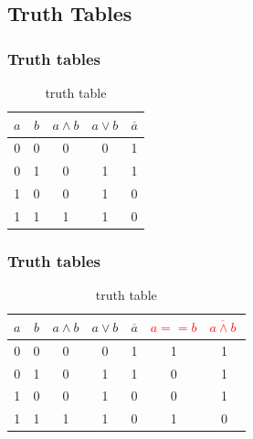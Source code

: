 \documentclass{beamer}
\begin{document}
\subsection{Truth Tables}
\begin{frame}\frametitle{Truth tables}
  \begin{table}[H]
  \centering
  \begin{tabular}{c|c||c|c|c}
  \textbf{$a$} & \textbf{$b$} & \textbf{$a\land b$} & \textbf{$a\lor b$} & \textbf{$\overline{a}$} \\ \hline
  0          & 0          & 0            & 0            & 1           \\
  0          & 1          & 0            & 1            & 1           \\
  1          & 0          & 0            & 1            & 0           \\
  1          & 1          & 1            & 1            & 0          
  \end{tabular}
  \caption{truth table}
  \label{tab:truth2}
  \end{table}
\end{frame}

\begin{frame}\frametitle{Truth tables}
   \begin{table}[H]
  \centering
  \begin{tabular}{c|c||c|c|c|c|c}
  \textbf{$a$} & \textbf{$b$} & \textbf{$a\land b$} & \textbf{$a\lor b$} & \textbf{$\overline{a}$} & \textbf{ \textcolor{red}{$a==b$}}  & \textbf{ \textcolor{red}{$\overline{a\land  b}\ $}} \\ \hline
  0          & 0          & 0            & 0            & 1          & 1        & 1      \\
  0          & 1          & 0            & 1            & 1          & 0        & 1  \\
  1          & 0          & 0            & 1            & 0          & 0        & 1   \\
  1          & 1          & 1            & 1            & 0          & 1        & 0  
  \end{tabular}
  \caption{truth table}
  \label{tab:truth3}
  \end{table}
\end{frame}
\end{document}
